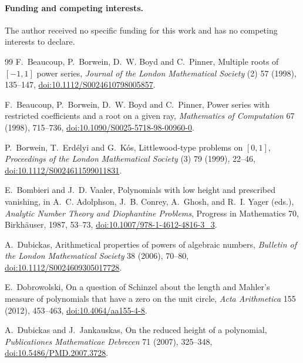 \documentclass[11pt]{article}
\begin{document}
\paragraph{Funding and competing interests.}
The author received no specific funding for this work and has no competing
interests to declare.

\begin{thebibliography}{99}
\small
{}
F.~Beaucoup, P.~Borwein, D.~W. Boyd and C.~Pinner,
\newblock Multiple roots of $[-1,1]$ power series,
\newblock \emph{Journal of the London Mathematical Society} (2) 57 (1998), 135--147,
\newblock \href{https://doi.org/10.1112/S0024610798005857}
{doi:10.1112/S0024610798005857}.

F.~Beaucoup, P.~Borwein, D.~W. Boyd and C.~Pinner,
\newblock Power series with restricted coefficients and a root on a given ray,
\newblock \emph{Mathematics of Computation} 67 (1998), 715--736,
\newblock \href{https://doi.org/10.1090/S0025-5718-98-00960-0}
{doi:10.1090/S0025-5718-98-00960-0}.

P.~Borwein, T.~Erd\'elyi and G.~K\'os,
\newblock Littlewood-type problems on $[0,1]$,
\newblock \emph{Proceedings of the London Mathematical Society} (3) 79
(1999), 22--46,
\newblock \href{https://doi.org/10.1112/S0024611599011831}
{doi:10.1112/S0024611599011831}.

E.~Bombieri and J.~D. Vaaler,
\newblock Polynomials with low height and prescribed vanishing,
\newblock in A.~C. Adolphson, J.~B. Conrey, A.~Ghosh, and R.~I. Yager (eds.),
\emph{Analytic Number Theory and Diophantine Problems},
Progress in Mathematics 70, Birkh\"auser, 1987, 53--73,
\newblock \href{https://doi.org/10.1007/978-1-4612-4816-3_3}
{doi:10.1007/978-1-4612-4816-3\_3}.

A.~Dubickas,
\newblock Arithmetical properties of powers of algebraic numbers,
\newblock \emph{Bulletin of the London Mathematical Society} 38 (2006), 70--80,
\newblock \href{https://doi.org/10.1112/S0024609305017728}
{doi:10.1112/S0024609305017728}.

E.~Dobrowolski,
\newblock On a question of Schinzel about the length and Mahler's measure of
polynomials that have a zero on the unit circle,
\newblock \emph{Acta Arithmetica} 155 (2012), 453--463,
\newblock \href{https://doi.org/10.4064/aa155-4-8}
{doi:10.4064/aa155-4-8}.

A.~Dubickas and J.~Jankauskas,
\newblock On the reduced height of a polynomial,
\newblock \emph{Publicationes Mathematicae Debrecen} 71 (2007), 325--348,
\newblock \href{https://doi.org/10.5486/PMD.2007.3728}
{doi:10.5486/PMD.2007.3728}.


\end{thebibliography}
\end{document}
